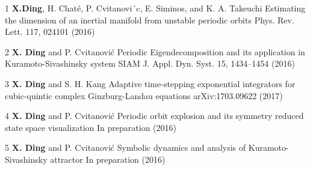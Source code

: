 



\begin{cvpub}

  \cvpubentry
  {1}
  {\textbf{X.Ding},  H. Chaté, P. Cvitanovi´c, E. Siminos, and K. A. Takeuchi}
  {Estimating the dimension of an inertial manifold from unstable periodic orbits}
  {Phys. Rev. Lett. 117, 024101 (2016)}

  \cvpubentry
  {2}
  {\textbf{X. Ding} and P. Cvitanovi\'c}
  {Periodic Eigendecomposition and its application in Kuramoto-Sivashinsky system}
  {SIAM J. Appl. Dyn. Syst. 15, 1434–1454 (2016)}

  \cvpubentry
  {3}
  {\textbf{X. Ding} and S. H. Kang}
  {Adaptive time-stepping exponential integrators for cubic-quintic complex Ginzburg-Landau equations}
  {arXiv:1703.09622 (2017)}

  \cvpubentry
  {4}
  {\textbf{X. Ding} and P. Cvitanovi\'c}
  {Periodic orbit explosion and its symmetry reduced state space visualization}
  {In preparation (2016)}

  \cvpubentry
  {5}
  {\textbf{X. Ding} and P. Cvitanovi\'c}
  {Symbolic dynamics and analysis of Kuramoto-Sivashinsky attractor}
  {In preparation (2016)}

\end{cvpub}
